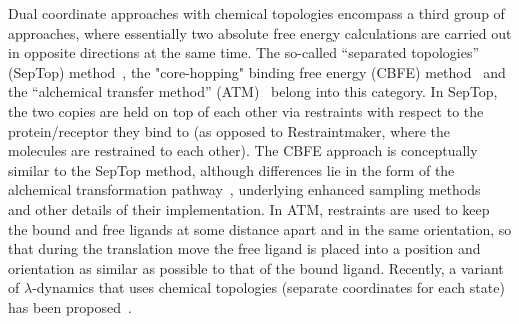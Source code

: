 \documentclass[9pt,bestpractices]{livecoms}
\begin{document}
Dual coordinate approaches with chemical topologies encompass a third group of approaches, where essentially two absolute free energy calculations are carried out in opposite directions at the same time.
The so-called ``separated topologies'' (SepTop) method~\cite{rocklin2013separated,Baumann_2023}, the "core-hopping" binding free energy (CBFE) method~\cite{Tsai_JChemInfModel_2026_v66_p1626} and the ``alchemical transfer method'' (ATM)~\cite{azimi2022relative} belong into this category. In SepTop, the two copies are held on top of each other via restraints with respect to the protein/receptor they bind to (as opposed to Restraintmaker, where the molecules are restrained to each other). %
The CBFE approach is conceptually similar to the SepTop method, although differences lie in the form of the alchemical transformation pathway~\cite{tsai2023amber}, underlying enhanced sampling methods~\cite{lee2023aces,tsai_jcheminfmodel_2024_v64_p7046,zhang_jchemtheorycomput_2024_v20_p3935} and other details of their implementation. 
In ATM, restraints are used to keep the bound and free ligands at some distance apart and in the same orientation, so that during the translation move the free ligand is placed into a position and orientation as similar as possible to that of the bound ligand. Recently, a variant of $\lambda$-dynamics that uses chemical topologies (separate coordinates for each state) has been proposed~\cite{Liesen_2024}.

\end{document}
